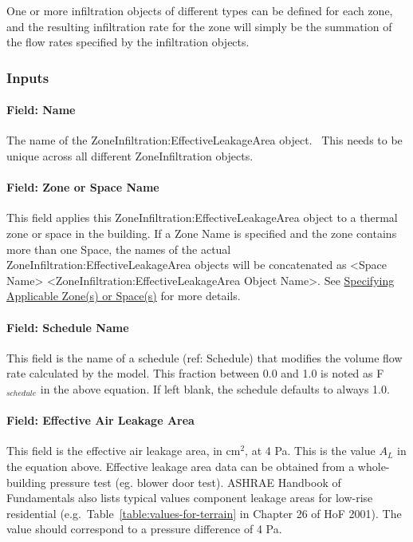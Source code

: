 One or more infiltration objects of different types can be defined for each zone, and the resulting infiltration rate for the zone will simply be the summation of the flow rates specified by the infiltration objects.

\subsubsection{Inputs}\label{inputs-1-005}

\paragraph{Field: Name}\label{field-name-1-004}

The name of the ZoneInfiltration:EffectiveLeakageArea object.~ This needs to be unique across all different ZoneInfiltration objects.

\paragraph{Field: Zone or Space Name}\label{field-zone-name-002}

This field applies this ZoneInfiltration:EffectiveLeakageArea object to a thermal zone or space in the building. If a Zone Name is specified and the zone contains more than one Space, the names of the actual ZoneInfiltration:EffectiveLeakageArea objects will be concatenated as \textless{}Space Name\textgreater{} \textless{}ZoneInfiltration:EffectiveLeakageArea Object Name\textgreater{}. See \hyperref[specifying-applicable-zones-or-spaces]{Specifying Applicable Zone(s) or Space(s)} for more details.

\paragraph{Field: Schedule Name}\label{field-schedule-name-1}

This field is the name of a schedule (ref: Schedule) that modifies the volume flow rate calculated by the model. This fraction between 0.0 and 1.0 is noted as F\(_{schedule}\) in the above equation. If left blank, the schedule defaults to always 1.0.

\paragraph{Field: Effective Air Leakage Area}\label{field-effective-air-leakage-area}

This field is the effective air leakage area, in cm\(^{2}\), at 4 Pa. This is the value \({A_L}\) in the equation above. Effective leakage area data can be obtained from a whole-building pressure test (eg. blower door test). ASHRAE Handbook of Fundamentals also lists typical values component leakage areas for low-rise residential (e.g.~Table~\ref{table:values-for-terrain} in Chapter 26 of HoF 2001). The value should correspond to a pressure difference of 4 Pa.

